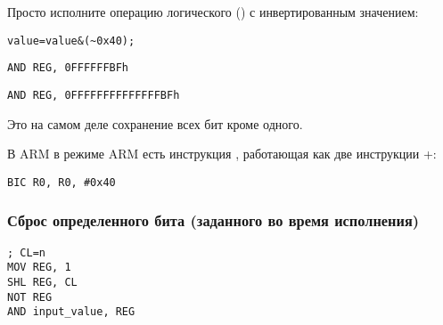 Просто исполните операцию логического  (\AND) с инвертированным значением:

\begin{lstlisting}[caption=\CCpp]
value=value&(~0x40);
\end{lstlisting}

\begin{lstlisting}[caption=x86]
AND REG, 0FFFFFFBFh
\end{lstlisting}

\begin{lstlisting}[caption=x64]
AND REG, 0FFFFFFFFFFFFFFBFh
\end{lstlisting}

Это на самом деле сохранение всех бит кроме одного.

В ARM в режиме ARM есть инструкция \BIC, работающая как две инструкции \NOT+\AND:

\begin{lstlisting}[caption=ARM (\ARMMode)]
BIC R0, R0, #0x40
\end{lstlisting}

\subsubsection{Сброс определенного бита (заданного во время исполнения)}



\begin{lstlisting}[caption=x86]
; CL=n
MOV REG, 1
SHL REG, CL
NOT REG
AND input_value, REG
\end{lstlisting}

